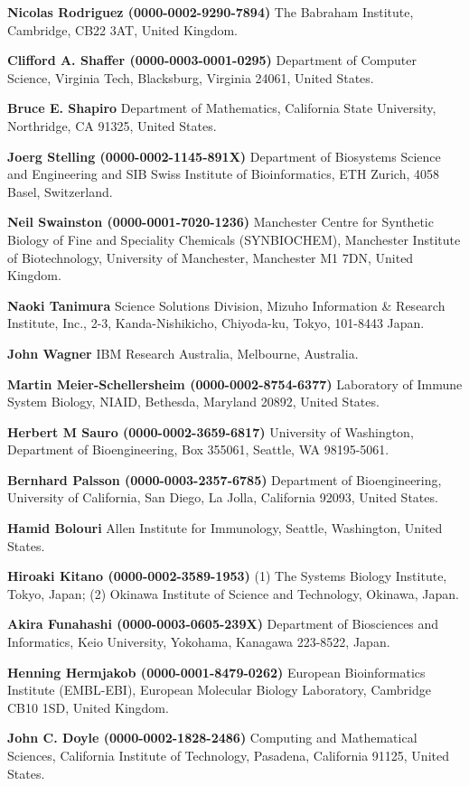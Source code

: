 \documentclass{sbml-paper}
\begin{document}
\textbf{Nicolas Rodriguez (0000-0002-9290-7894)} The Babraham Institute, Cambridge, CB22 3AT, United Kingdom.

\textbf{Clifford A. Shaffer (0000-0003-0001-0295)} Department of Computer Science, Virginia Tech, Blacksburg, Virginia 24061, United States.

\textbf{Bruce E. Shapiro} Department of Mathematics, California State University, Northridge, CA 91325, United States.

\textbf{Joerg Stelling (0000-0002-1145-891X)} Department of Biosystems Science and Engineering and SIB Swiss Institute of Bioinformatics, ETH Zurich, 4058 Basel, Switzerland.

\textbf{Neil Swainston (0000-0001-7020-1236)} Manchester Centre for Synthetic Biology of Fine and Speciality Chemicals (SYNBIOCHEM), Manchester Institute of Biotechnology, University of Manchester, Manchester M1 7DN, United Kingdom.

\textbf{Naoki Tanimura} Science Solutions Division, Mizuho Information & Research Institute, Inc., 2-3, Kanda-Nishikicho, Chiyoda-ku, Tokyo, 101-8443 Japan.

\textbf{John Wagner} IBM Research Australia, Melbourne, Australia.

\textbf{Martin Meier-Schellersheim (0000-0002-8754-6377)} Laboratory of Immune System Biology, NIAID, Bethesda, Maryland 20892, United States.

\textbf{Herbert M Sauro (0000-0002-3659-6817)} University of Washington, Department of Bioengineering, Box 355061, Seattle, WA 98195-5061.

\textbf{Bernhard Palsson (0000-0003-2357-6785)} Department of Bioengineering, University of California, San Diego, La Jolla, California 92093, United States.

\textbf{Hamid Bolouri} Allen Institute for Immunology, Seattle, Washington, United States.

\textbf{Hiroaki Kitano (0000-0002-3589-1953)} (1) The Systems Biology Institute, Tokyo, Japan; (2) Okinawa Institute of Science and Technology, Okinawa, Japan.

\textbf{Akira Funahashi (0000-0003-0605-239X)} Department of Biosciences and Informatics, Keio University, Yokohama, Kanagawa 223-8522, Japan.

\textbf{Henning Hermjakob (0000-0001-8479-0262)} European Bioinformatics Institute (EMBL-EBI), European Molecular Biology Laboratory, Cambridge CB10 1SD, United Kingdom.

\textbf{John C. Doyle (0000-0002-1828-2486)} Computing and Mathematical Sciences, California Institute of Technology, Pasadena, California 91125, United States.
\end{document}
